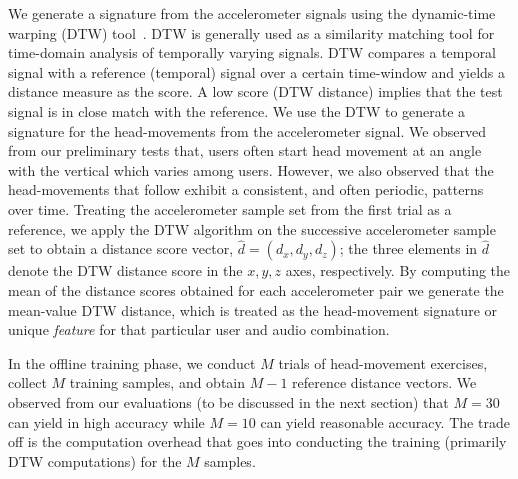 We generate a signature from the accelerometer signals using the
dynamic-time warping (DTW) tool~\cite{dtw}. DTW is generally used
as a similarity matching tool for time-domain analysis of
temporally varying signals.
DTW compares a temporal signal with a reference (temporal) signal over a 
certain time-window and yields a distance measure as the score. A low score 
(DTW distance) implies that the test signal is in close match with the 
reference.
We use the DTW to generate a signature for the head-movements
from the accelerometer signal.
We observed from our preliminary tests that, users often
start head movement at an angle with the vertical which varies among users.
However, we also observed that the head-movements that follow exhibit a 
consistent, and often periodic, patterns over time.
Treating the accelerometer sample set from the first trial as a reference, we
apply the DTW algorithm on the successive accelerometer sample set to obtain a
distance score vector, $\hat{d} = (d_x, d_y, d_z)$; the three elements in
$\hat{d}$ denote the DTW distance score in the $x, y, z$ axes, respectively.
By computing the mean of the distance scores obtained for each accelerometer
pair we generate the mean-value DTW distance, which is treated as the
head-movement signature or unique {\em feature} for that particular user and 
audio
combination.

In the offline training phase, we conduct 
$M$ trials of head-movement exercises, collect $M$ training samples, and 
obtain $M-1$ reference distance vectors. We observed from our evaluations (to 
be discussed in the next section) that $M = 30$ can yield in high accuracy 
while $M = 10$ can yield reasonable accuracy. The trade off is the computation 
overhead that goes into conducting the training (primarily DTW computations) 
for the $M$ samples.


